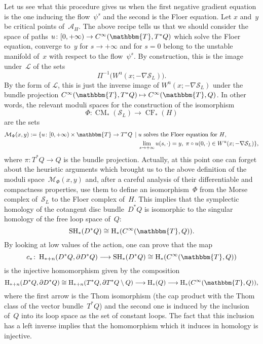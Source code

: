 \documentclass[12pt,twoside]{amsart}
\theoremstyle{plain}
\numberwithin{figure}{section}
\numberwithin{equation}{section}
\def\u{\operatorname{u}}
\def\H{\operatorname{H}}
\def\CM{\operatorname{CM}}
\def\CF{\operatorname{CF}}
\def\SH{\operatorname{SH}}
\def\ca{{\mathcal A}}
\def\TT{\mathbbm{T}}
\begin{document}
Let us see what this procedure gives us when the first negative gradient equation is the one inducing the flow~$\psi^s$ and the second is the Floer equation. Let $x$ and~$y$ be critical points of~$\ca_H$. The above recipe tells us that we should consider the space of paths 
$u \colon [0,+\infty) \rightarrow C^{\infty}(\TT,T^*Q)$ which solve the Floer equation, 
converge to~$y$ for $s \rightarrow +\infty$ and for $s=0$ belong to the unstable manifold of~$x$ with respect to the flow~$\psi^s$. By construction, this is the image under~$\mathcal{L}$ 
of the sets
\[
\Pi^{-1}\bigl(W^{\u}(x;-\nabla \mathcal{S}_L)\bigr).
\]
By the form of $\mathcal{L}$, this is just the inverse image of $W^{\u}(x;-\nabla \mathcal{S}_L)$  under the bundle projection $C^{\infty}(\TT,T^*Q) \mapsto C^{\infty}(\TT,Q)$. 
In other words, the relevant moduli spaces for the construction of the isomorphism
%
\begin{equation} \label{cm:Phi}
\Phi \colon \CM_*(\mathcal{S}_L) \rightarrow \CF_*(H)
\end{equation}
are the sets
\[
\begin{split}
\mathcal{M}_{\Phi}(x,y):= \{u \colon [0,+\infty) \times \TT \rightarrow T^*Q \,\mid\; & 
\mbox{$u$ solves the Floer equation for $H$}, \\ & 
\lim_{s \rightarrow +\infty} u(s,\cdot)=y,  \; \pi \circ u(0,\cdot) \in 
                                                  W^{\u}(x;-\nabla \mathcal{S}_L)\},
\end{split}
\]
where $\pi \colon T^* Q \rightarrow Q$ is the bundle projection. Actually, at this point one can forget about the heuristic arguments which brought us to the above definition of 
the moduli space~$\mathcal{M}_{\Phi}(x,y)$ and, after a careful analysis of their differentiable and compactness properties, use them to define an isomorphism~$\Phi$ from the Morse complex 
of~$\mathcal{S}_L$ to the Floer complex of~$H$. This implies that the symplectic homology of the cotangent disc bundle~$D^* Q$ is isomorphic to the singular homology of the free loop space of~$Q$:
\begin{equation}
\label{iso}
\SH_*(D^*Q) \cong \H_*(C^{\infty}(\TT,Q)).
\end{equation}
By looking at low values of the action, one can prove that the map 
\[
c_* \colon \H_{*+n}(D^*Q,\partial D^*Q) \longrightarrow \SH_*(D^*Q) \cong \H_*(C^{\infty}(\TT,Q))
\]
is the injective homomorphism given by the composition
\[
\H_{*+n}(D^*Q,\partial D^*Q) \cong \H_{*+n}(T^*Q,\partial T^*Q\setminus Q) \longrightarrow \H_*(Q) \longrightarrow \H_*(C^{\infty}(\TT,Q)),
\]
where the first arrow is the Thom isomorphism
(the cap product with the Thom class of the vector bundle~$T^*Q$) 
and the second one is induced by the inclusion of~$Q$ into its loop space as the set of constant loops. The fact that this inclusion has a left inverse implies that the homomorphism which it induces in homology is injective.
\end{document}
